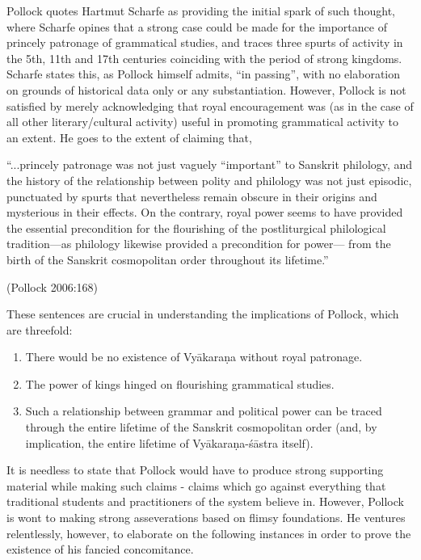Pollock quotes Hartmut Scharfe as providing the initial spark of such thought, where Scharfe opines that a strong case could be made for the importance of princely patronage of grammatical studies, and traces three spurts of activity in the 5th, 11th and 17th centuries coinciding with the period of strong kingdoms. Scharfe states this, as Pollock himself admits, ``in passing'', with no elaboration on grounds of historical data only or any substantiation. However, Pollock is not satisfied by merely acknowledging that royal encouragement was (as in the case of all other literary/cultural activity) useful in promoting grammatical activity to an extent. He goes to the extent of claiming that,
\begin{myquote}
``...princely patronage was not just vaguely ``important'' to Sanskrit philology, and the history of the relationship between polity and philology was not just episodic, punctuated by spurts that nevertheless remain obscure in their origins and mysterious in their effects. On the contrary, royal power seems to have provided the essential precondition for the flourishing of the postliturgical philological tradition---as philology likewise provided a precondition for power--- from the birth of the Sanskrit cosmopolitan order throughout its lifetime.''

\hfill (Pollock 2006:168)
\end{myquote}

These sentences are crucial in understanding the implications of Pollock, which are threefold:
\begin{enumerate}
\item There would be no existence of Vyākaraṇa without royal patronage. 
\item The power of kings hinged on flourishing grammatical studies.
\item Such a relationship between grammar and political power can be traced through the entire lifetime of the Sanskrit cosmopolitan order (and, by implication, the entire lifetime of Vyākaraṇa-śāstra itself).
\end{enumerate}

It is needless to state that Pollock would have to produce strong supporting material while making such claims - claims which go against everything that traditional students and practitioners of the system believe in. However, Pollock is wont to making strong asseverations based on flimsy foundations. He ventures relentlessly, however, to elaborate on the following instances in order to prove the existence of his fancied concomitance.

